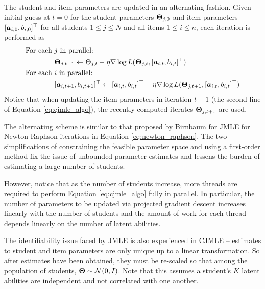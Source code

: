 The student and item parameters are updated in an alternating fashion. Given initial guess at $t=0$ for the student parameters $\boldsymbol{\Theta}_{j,0}$ and item parameters $[\boldsymbol{a}_{i,0}, b_{i,0}]^\top$ for all students $1\leq j \leq N$ and all items $1\leq i \leq n$, each iteration is performed as
\begin{equation}
\begin{split}
  \text{For each } &j \text{ in parallel:} \\
  &\boldsymbol{\Theta}_{j,t+1} \gets \Theta_{j,t} - \eta \nabla \log L(\boldsymbol{\Theta}_{j,t}, [\boldsymbol{a}_{i,t}, b_{i,t}]^\top) \\
  \text{For each } &i \text{ in parallel:} \\
  &[\boldsymbol{a}_{i,t+1}, b_{i,t+1}]^\top \gets [\boldsymbol{a}_{i,t}, b_{i,t}]^\top - \eta \nabla \log L(\boldsymbol{\Theta}_{j,t+1}, [\boldsymbol{a}_{i,t}, b_{i,t}]^\top)
\end{split}
  \label{eq:cjmle_algo}
\end{equation}
Notice that when updating the item parameters in iteration $t+1$ (the second line of Equation \ref{eq:cjmle_algo}), the recently computed iterates $\boldsymbol{\Theta}_{j,t+1}$ are used.

The alternating scheme is similar to that proposed by Birnbaum \cite{birnbaum1968} for JMLE for Newton-Raphson iterations in Equation \ref{eq:newton_raphson}. The two simplifications of constraining the feasible parameter space and using a first-order method fix the issue of unbounded parameter estimates and lessens the burden of estimating a large number of students.

However, notice that as the number of students increase, more threads are required to perform Equation \ref{eq:cjmle_algo} fully in parallel. In particular, the number of parameters to be updated via projected gradient descent increases linearly with the number of students and the amount of work for each thread depends linearly on the number of latent abilities.

The identifiability issue faced by JMLE is also experienced in CJMLE -- estimates to student and item parameters are only unique up to a linear transformation. So after estimates have been obtained, they must be re-scaled so that among the population of students, $\boldsymbol{\Theta} \sim \mathcal{N}(0,I)$. Note that this assumes a student's $K$ latent abilities are independent and not correlated with one another.


